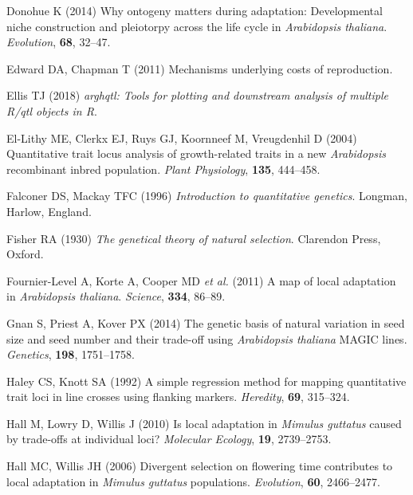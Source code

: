 \documentclass[]{article}
\begin{document}
\leavevmode\hypertarget{ref-donohue2014ontogeny}{}%
Donohue K (2014) Why ontogeny matters during adaptation: Developmental niche construction and pleiotorpy across the life cycle in \emph{Arabidopsis thaliana}. \emph{Evolution}, \textbf{68}, 32--47.

\leavevmode\hypertarget{ref-edward2011mechanisms}{}%
Edward DA, Chapman T (2011) Mechanisms underlying costs of reproduction.

\leavevmode\hypertarget{ref-ellis_arghqtl}{}%
Ellis TJ (2018) \emph{\textup{arghqtl}: Tools for plotting and downstream analysis of multiple R/qtl objects in R}.

\leavevmode\hypertarget{ref-el2004quantitative}{}%
El-Lithy ME, Clerkx EJ, Ruys GJ, Koornneef M, Vreugdenhil D (2004) Quantitative trait locus analysis of growth-related traits in a new \emph{Arabidopsis} recombinant inbred population. \emph{Plant Physiology}, \textbf{135}, 444--458.

\leavevmode\hypertarget{ref-Falconer1996}{}%
Falconer DS, Mackay TFC (1996) \emph{Introduction to quantitative genetics}. Longman, Harlow, England.

\leavevmode\hypertarget{ref-Fisher1930}{}%
Fisher RA (1930) \emph{The genetical theory of natural selection}. Clarendon Press, Oxford.

\leavevmode\hypertarget{ref-fournier2011map}{}%
Fournier-Level A, Korte A, Cooper MD \emph{et al.} (2011) A map of local adaptation in \emph{Arabidopsis thaliana}. \emph{Science}, \textbf{334}, 86--89.

\leavevmode\hypertarget{ref-gnan2014genetic}{}%
Gnan S, Priest A, Kover PX (2014) The genetic basis of natural variation in seed size and seed number and their trade-off using \emph{Arabidopsis thaliana} MAGIC lines. \emph{Genetics}, \textbf{198}, 1751--1758.

\leavevmode\hypertarget{ref-Haley1992}{}%
Haley CS, Knott SA (1992) A simple regression method for mapping quantitative trait loci in line crosses using flanking markers. \emph{Heredity}, \textbf{69}, 315--324.

\leavevmode\hypertarget{ref-Hall2010}{}%
Hall M, Lowry D, Willis J (2010) Is local adaptation in \emph{Mimulus guttatus} caused by trade-offs at individual loci? \emph{Molecular Ecology}, \textbf{19}, 2739--2753.

\leavevmode\hypertarget{ref-Hall2006}{}%
Hall MC, Willis JH (2006) Divergent selection on flowering time contributes to local adaptation in \emph{Mimulus guttatus} populations. \emph{Evolution}, \textbf{60}, 2466--2477.
\end{document}
